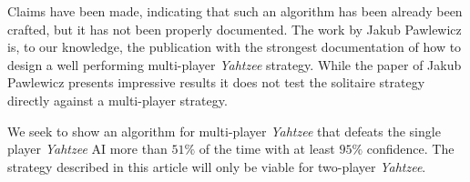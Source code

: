 Claims have been made, indicating that such an algorithm has been already been crafted, but it has not been properly documented.
The work by Jakub Pawlewicz is, to our knowledge, the publication with the strongest documentation of how to design a well performing multi-player \emph{Yahtzee} strategy.
While the paper of Jakub Pawlewicz\citep{pawlewicz2011nearly} presents impressive results it does not test the solitaire strategy directly against a multi-player strategy.

We seek to show an algorithm for multi-player \emph{Yahtzee} that defeats the single player \emph{Yahtzee} AI more than $51\%$ of the time with at least $95\%$ confidence.
The strategy described in this article will only be viable for two-player \emph{Yahtzee}.

%


